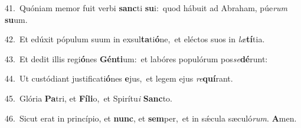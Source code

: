 {\numbfont\textcolor{\numbcolor}{41.}}~Quóniam memor fuit verbi \textbf{sanc}\-ti \textbf{su}\-i:~\star quod hábuit ad Abraham, púe\textit{rum} \textbf{su}\-um.\par
{\numbfont\textcolor{\numbcolor}{42.}}~Et edúxit pópulum suum in exsul\-\textbf{ta}\-ti\-\textbf{ó}\-ne,~\star et eléctos suos in \textit{læ}\-\textbf{tí}tia.\par
{\numbfont\textcolor{\numbcolor}{43.}}~Et dedit illis regi\-\textbf{ó}\-nes \textbf{Gén}\-\textbf{ti}um:~\star et labóres populórum pos\-\textit{se}\-\textbf{dé}runt:\par
{\numbfont\textcolor{\numbcolor}{44.}}~Ut custódiant justificati\-\textbf{ó}\-nes \textbf{e}\-jus,~\star et legem ejus \textit{re}\-\textbf{quí}rant.\par
{\numbfont\textcolor{\numbcolor}{45.}}~Glória \textbf{Pa}\-tri, et \textbf{Fí}\-\textbf{li}o,~\star et Spirítu\textit{i} \textbf{Sanc}\-to.\par
{\numbfont\textcolor{\numbcolor}{46.}}~Sicut erat in princípio, et \textbf{nunc}\-, et \textbf{sem}\-per,~\star et in sǽcula sæculó\-\textit{rum}\-. \textbf{A}\-men.\par
